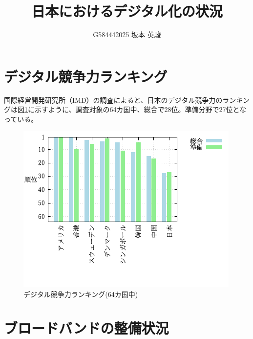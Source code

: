 \documentclass[a4paper,11pt,dvipdfmx]{ujarticle}
\title{日本におけるデジタル化の状況}
\author{G584442025 坂本 英駿}
\begin{document}
\maketitle %

\section{デジタル競争力ランキング}

 国際経営開発研究所（IMD）の調査\cite{imd}によると、日本のデジタル競争力のランキングは図\ref{fig:競争力}に示すように、調査対象の64カ国中、総合で28位。準備分野で27位となっている。
\begin{figure}[htbp]
 \centering
 \includegraphics{fig51.png}
 \caption{デジタル競争力ランキング(64カ国中)}\label{fig:競争力}
\end{figure}

\section{ブロードバンドの整備状況}
\end{document}
